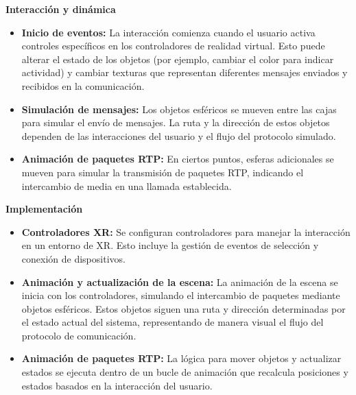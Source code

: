 \documentclass[a4paper, 12pt]{book}
\begin{document}
\textbf{Interacción y dinámica}

\begin{itemize}
  \item \textbf{Inicio de eventos:} La interacción comienza cuando el usuario activa controles específicos en los controladores de realidad virtual. 
  Esto puede alterar el estado de los objetos (por ejemplo, cambiar el color para indicar actividad) y cambiar texturas que 
  representan diferentes mensajes enviados y recibidos en la comunicación.
  
  \item \textbf{Simulación de mensajes:} Los objetos esféricos se mueven entre las cajas para simular el envío de mensajes. 
  La ruta y la dirección de estos objetos dependen de las interacciones del usuario y el flujo del protocolo simulado.

  \item \textbf{Animación de paquetes RTP:} En ciertos puntos, esferas adicionales se mueven para simular la transmisión de paquetes RTP, 
  indicando el intercambio de media en una llamada establecida.
  
\end{itemize}


\textbf{Implementación}

\begin{itemize}
  \item \textbf{Controladores XR:} Se configuran controladores para manejar la interacción en un entorno de XR. 
  Esto incluye la gestión de eventos de selección y conexión de dispositivos.
  
  \item \textbf{Animación y actualización de la escena:} La animación de la escena se inicia con los controladores, simulando el intercambio de 
  paquetes mediante objetos esféricos. Estos objetos siguen una ruta y dirección determinadas por el estado actual del sistema, representando de 
  manera visual el flujo del protocolo de comunicación.

  \item \textbf{Animación de paquetes RTP:} La lógica para mover objetos y actualizar estados se ejecuta dentro de un bucle 
  de animación que recalcula posiciones y estados basados en la interacción del usuario.
  
\end{itemize}
\end{document}
